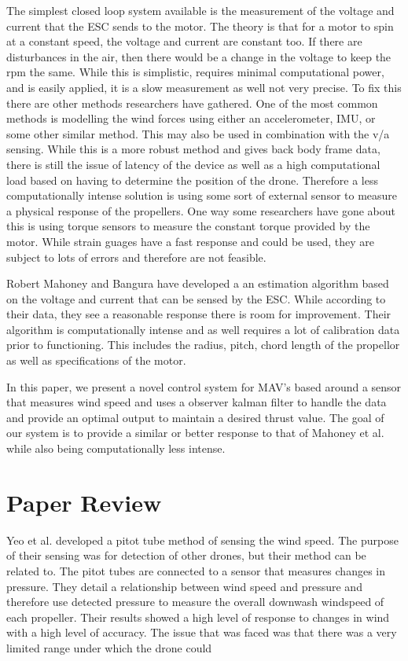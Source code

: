 \documentclass[twocolumn]{article}
\begin{document}
	The simplest closed loop system available is the measurement of the voltage and current that the ESC sends to the motor. The theory is that for a motor to spin at a constant speed, the voltage and current are constant too. If there are disturbances in the air, then there would be a change in the voltage to keep the rpm the same. While this is simplistic, requires minimal computational power, and is easily applied,  it is a slow measurement as well not very precise. To fix this there are other methods researchers have gathered. One of the most common methods is modelling the wind forces using either an accelerometer, IMU, or some other similar method. This may also be used in combination with the v/a sensing. While this is a more robust method and gives back body frame data, there is still the issue of latency of the device as well as a high computational load based on having to determine the position of the drone. Therefore a less computationally intense solution is using some sort of external sensor to measure a physical response of the propellers. One way some researchers have gone about this is using torque sensors to measure the constant torque provided by the motor. While strain guages have a fast response and could be used, they are subject to lots of errors and therefore are not feasible. 
	
	Robert Mahoney and Bangura have developed a an estimation algorithm based on the voltage and current that can be sensed by the ESC. While according to their data, they see a reasonable response there is room for improvement. Their algorithm is computationally intense and as well requires a lot of calibration data prior to functioning. This includes the radius, pitch, chord length of the propellor as well as specifications of the motor. 
	
	In this paper, we present a novel control system for MAV's based around a sensor that measures wind speed and uses a observer kalman filter to handle the data and provide an optimal output to maintain a desired thrust value. The goal of our system is to provide a similar or better response to that of Mahoney et al. while also being computationally less intense. 
	\section{Paper Review}
	Yeo et al. developed a pitot tube method of sensing the wind speed. The purpose of their sensing was for detection of other drones, but their method can be related to. The pitot tubes are connected to a sensor that measures changes in pressure. They detail a relationship between wind speed and pressure and therefore use detected pressure to measure the overall downwash windspeed of each propeller. Their results showed a high level of response to changes in wind with a high level of accuracy. The issue that was faced was that there was a very limited range under which the drone could
	
\end{document}

